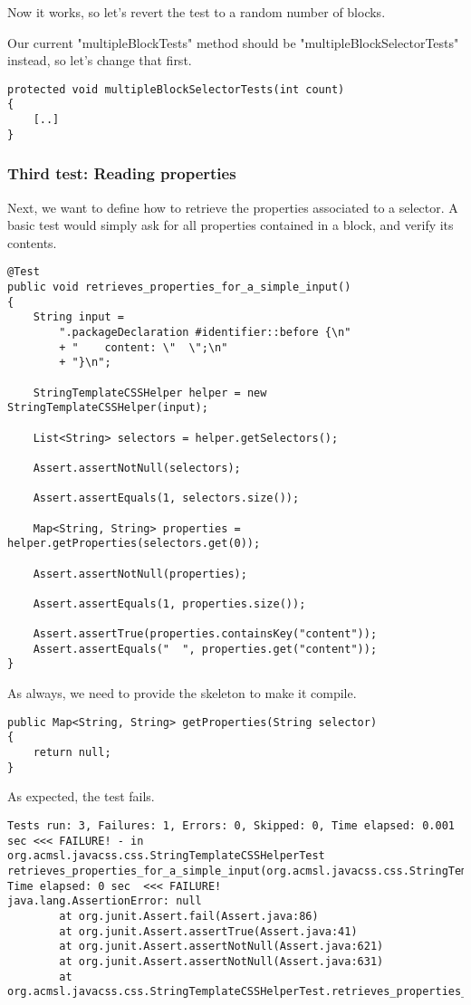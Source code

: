 \documentclass[11pt]{article}
\begin{document}
Now it works, so let's revert the test to a random number of blocks.

Our current "multipleBlockTests" method should be "multipleBlockSelectorTests" instead, so let's change that first.

\begin{verbatim}
protected void multipleBlockSelectorTests(int count)
{
    [..]
}
\end{verbatim}


\subsubsection{Third test: Reading properties}
\label{sec-1-4-4}

Next, we want to define how to retrieve the properties associated to a selector. A basic test would simply ask for all properties contained in a block, and verify its contents. 

\begin{verbatim}
@Test
public void retrieves_properties_for_a_simple_input()
{
    String input =
        ".packageDeclaration #identifier::before {\n"
        + "    content: \"  \";\n"
        + "}\n";

    StringTemplateCSSHelper helper = new StringTemplateCSSHelper(input);

    List<String> selectors = helper.getSelectors();

    Assert.assertNotNull(selectors);

    Assert.assertEquals(1, selectors.size());

    Map<String, String> properties = helper.getProperties(selectors.get(0));

    Assert.assertNotNull(properties);

    Assert.assertEquals(1, properties.size());

    Assert.assertTrue(properties.containsKey("content"));
    Assert.assertEquals("  ", properties.get("content"));
}
\end{verbatim}

As always, we need to provide the skeleton to make it compile.

\begin{verbatim}
public Map<String, String> getProperties(String selector)
{
    return null;
}
\end{verbatim}

As expected, the test fails.

\begin{verbatim}
Tests run: 3, Failures: 1, Errors: 0, Skipped: 0, Time elapsed: 0.001 sec <<< FAILURE! - in org.acmsl.javacss.css.StringTemplateCSSHelperTest
retrieves_properties_for_a_simple_input(org.acmsl.javacss.css.StringTemplateCSSHelperTest)  Time elapsed: 0 sec  <<< FAILURE!
java.lang.AssertionError: null
        at org.junit.Assert.fail(Assert.java:86)
        at org.junit.Assert.assertTrue(Assert.java:41)
        at org.junit.Assert.assertNotNull(Assert.java:621)
        at org.junit.Assert.assertNotNull(Assert.java:631)
        at org.acmsl.javacss.css.StringTemplateCSSHelperTest.retrieves_properties_for_a_simple_input(StringTemplateCSSHelperTest.java:123)
\end{verbatim}
\end{document}
